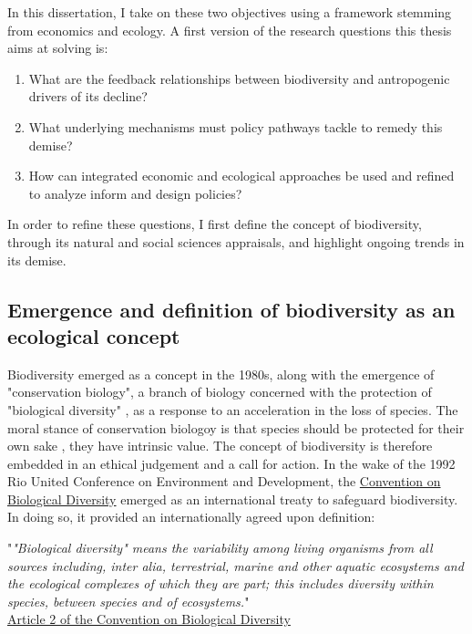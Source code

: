 In this dissertation, I take on these two objectives using a framework stemming from economics and ecology. A first version of the research questions this thesis aims at solving is: 
\begin{enumerate}
\setlength{\itemsep}{0pt} %
\item What are the feedback relationships between biodiversity and antropogenic drivers of its decline? 
\item What underlying mechanisms must policy pathways tackle to remedy this demise?
\item  How can integrated economic and ecological approaches be used and refined to analyze inform and design policies? 
\end{enumerate}

In order to refine these questions, I first define the concept of biodiversity, through its natural and social sciences appraisals, and highlight ongoing trends in its demise.

\clearpage


{}
\subsection*{Emergence and definition of biodiversity as an ecological concept}


Biodiversity emerged as a concept in the 1980s, along with the emergence of "conservation biology", a branch of biology concerned with the protection of "biological diversity" \citep{soule_what_1985}, as a response to an acceleration in the loss of species. The moral stance of conservation biologoy is that species should be protected for their own sake \citep{soule_conservation_1986}, they have intrinsic value. 
The concept of biodiversity is therefore embedded in an ethical judgement and a call for action. In the wake of the 1992 Rio United Conference on Environment and Development, the \href{https://www.cbd.int/}{Convention on Biological Diversity} emerged as an international treaty to safeguard biodiversity. In doing so, it provided an internationally agreed upon definition:

\begin{displayquote}
"\textit{"Biological diversity" means the variability among living organisms from all sources including, inter alia, terrestrial, marine and other aquatic ecosystems and the ecological complexes of which they are part; this includes diversity within species, between species and of ecosystems.}"\\
\hspace*{\fill} \small{\href{https://www.cbd.int/convention/articles/default.shtml?a=cbd-02}{Article 2 of the Convention on Biological Diversity}}
\end{displayquote}


